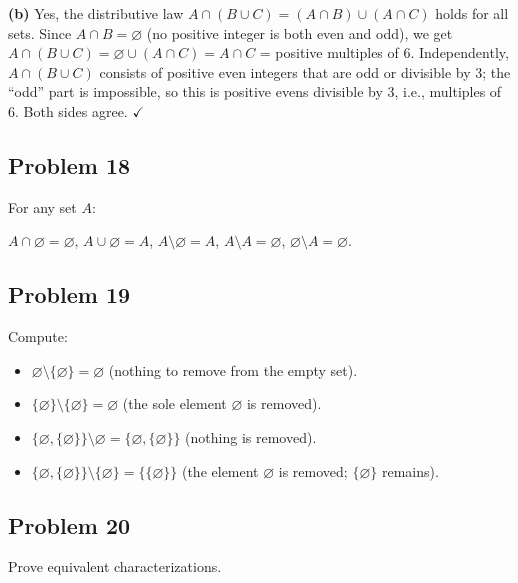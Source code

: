 \textbf{(b)} Yes, the distributive law $A \cap (B \cup C) = (A \cap B) \cup (A \cap C)$ holds for all sets. Since $A \cap B = \varnothing$ (no positive integer is both even and odd), we get $A \cap (B \cup C) = \varnothing \cup (A \cap C) = A \cap C$ = positive multiples of 6. Independently, $A \cap (B \cup C)$ consists of positive even integers that are odd or divisible by 3; the ``odd'' part is impossible, so this is positive evens divisible by 3, i.e., multiples of 6. Both sides agree. $\checkmark$

\subsection*{Problem 18}
For any set $A$:

$\boxed{A \cap \varnothing = \varnothing}$, \quad $\boxed{A \cup \varnothing = A}$, \quad $\boxed{A \setminus \varnothing = A}$, \quad $\boxed{A \setminus A = \varnothing}$, \quad $\boxed{\varnothing \setminus A = \varnothing}$.

\subsection*{Problem 19}
Compute:

\begin{itemize}
  \item $\varnothing \setminus \{\varnothing\} = \boxed{\varnothing}$ \quad (nothing to remove from the empty set).
  \item $\{\varnothing\} \setminus \{\varnothing\} = \boxed{\varnothing}$ \quad (the sole element $\varnothing$ is removed).
  \item $\{\varnothing, \{\varnothing\}\} \setminus \varnothing = \boxed{\{\varnothing, \{\varnothing\}\}}$ \quad (nothing is removed).
  \item $\{\varnothing, \{\varnothing\}\} \setminus \{\varnothing\} = \boxed{\{\{\varnothing\}\}}$ \quad (the element $\varnothing$ is removed; $\{\varnothing\}$ remains).
\end{itemize}

\subsection*{Problem 20}
Prove equivalent characterizations.

